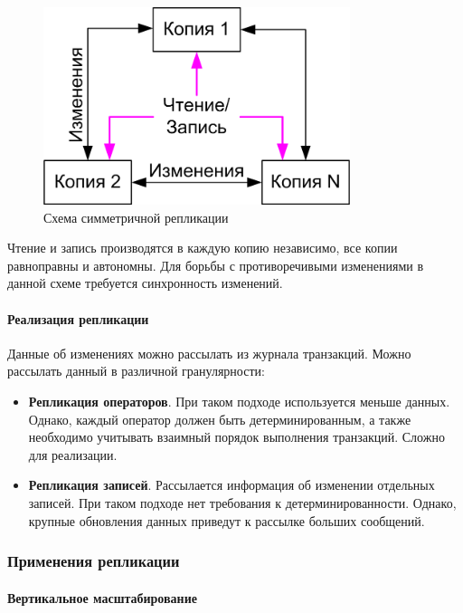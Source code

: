 \begin{figure}[h]
    \centering
    \includegraphics[width=0.8\textwidth]{../assets/kgeorgiy/distributed/Replication_Symmetric.png}
    \caption{Схема симметричной репликации}
    \label{repl-symm}
\end{figure}

Чтение и запись производятся в каждую копию независимо, все копии равноправны и автономны. Для
борьбы с противоречивыми изменениями в данной схеме требуется синхронность изменений.

\paragraph{Реализация репликации}

Данные об изменениях можно рассылать из журнала транзакций. Можно рассылать данный в различной
гранулярности:

\begin{itemize}
    \item \textbf{Репликация операторов}. При таком подходе используется меньше данных. Однако,
        каждый оператор должен быть детерминированным, а также необходимо учитывать взаимный
        порядок выполнения транзакций. Сложно для реализации.
    \item \textbf{Репликация записей}. Рассылается информация об изменении отдельных записей. При
        таком подходе нет требования к детерминированности. Однако, крупные обновления данных
        приведут к рассылке больших сообщений.
\end{itemize}

\subsubsection{Применения репликации}

\paragraph{Вертикальное масштабирование}

